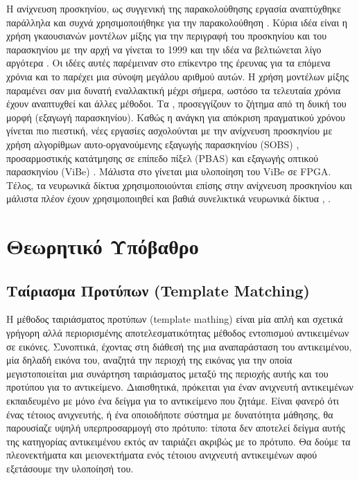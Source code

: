 \documentclass[11pt,a4paper,english,greek,twoside]{../Thesis}
\begin{document}
\par Η ανίχνευση προσκηνίου, ως συγγενική της παρακολούθησης εργασία αναπτύχθηκε παράλληλα και συχνά χρησιμοποιήθηκε για την παρακολούθηση \cite{isard_2001}. Κύρια ιδέα είναι η χρήση γκαουσιανών μοντέλων μίξης για την περιγραφή του προσκηνίου και του παρασκηνίου με την αρχή να γίνεται το 1999 \cite{stauffer_1999} και την ιδέα να βελτιώνεται λίγο αργότερα \cite{kaewtrakulpong_2002}. Οι ιδέες αυτές παρέμειναν στο επίκεντρο της έρευνας για τα επόμενα χρόνια \cite{wang_2005} και το \cite{bouwmans_2008} παρέχει μια σύνοψη μεγάλου αριθμού αυτών. Η χρήση μοντέλων μίξης παραμένει σαν μια δυνατή εναλλακτική μέχρι σήμερα, ωστόσο τα τελευταία χρόνια έχουν αναπτυχθεί και άλλες μέθοδοι. Τα \cite{jenifa_2012}, \cite{bouwmans_2014} προσεγγίζουν το ζήτημα από τη δυική του μορφή (εξαγωγή παρασκηνίου). Καθώς η ανάγκη για απόκριση πραγματικού χρόνου γίνεται πιο πιεστική, νέες εργασίες ασχολούνται με την ανίχνευση προσκηνίου με χρήση αλγορίθμων αυτο-οργανούμενης εξαγωγής παρασκηνίου (SOBS) \cite{maddalena_2012}, προσαρμοστικής κατάτμησης σε επίπεδο πίξελ (PBAS) \cite{hofmann_2012} και εξαγωγής οπτικού παρασκηνίου (ViBe) \cite{barnich_2009}. Μάλιστα στο \cite{kryjak_2013} γίνεται μια υλοποίηση του ViBe σε FPGA. Τέλος, τα νευρωνικά δίκτυα χρησιμοποιούνται επίσης στην ανίχνευση προσκηνίου \cite{ruchanurucks_2006} και μάλιστα πλέον έχουν χρησιμοποιηθεί και βαθιά συνελικτικά νευρωνικά δίκτυα \cite{braham_2016}, \cite{babaee_2017}.


\section{Θεωρητικό Υπόβαθρο}
\subsection{Ταίριασμα Προτύπων (Template Matching)}
Η μέθοδος ταιριάσματος προτύπων (template mathing) είναι μία απλή και σχετικά γρήγορη αλλά περιορισμένης αποτελεσματικότητας μέθοδος εντοπισμού αντικειμένων σε εικόνες. Συνοπτικά, έχοντας στη διάθεσή της μια αναπαράσταση του αντικειμένου, μία δηλαδή εικόνα του, αναζητά την περιοχή της εικόνας για την οποία μεγιστοποιείται μια συνάρτηση ταιριάσματος μεταξύ της περιοχής αυτής και του προτύπου για το αντικείμενο. Διαισθητικά, πρόκειται για έναν ανιχνευτή αντικειμένων εκπαιδευμένο με μόνο ένα δείγμα για το αντικείμενο που ζητάμε. Είναι φανερό ότι ένας τέτοιος ανιχνευτής, ή ένα οποιοδήποτε σύστημα με δυνατότητα μάθησης, θα παρουσίαζε υψηλή υπερπροσαρμογή στο πρότυπο: τίποτα δεν αποτελεί δείγμα αυτής της κατηγορίας αντικειμένου εκτός αν ταιριάζει ακριβώς με το πρότυπο. Θα δούμε τα πλεονεκτήματα και μειονεκτήματα ενός τέτοιου ανιχνευτή αντικειμένων αφού εξετάσουμε την υλοποίησή του.
\end{document}
